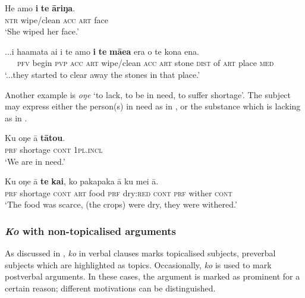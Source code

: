 \ea\label{ex:8.141}
\gll He amo \textbf{i} \textbf{te} \textbf{{\ꞌ}āriŋa}. \\
\textsc{ntr} wipe/clean \textsc{acc} \textsc{art} face \\

\glt 
‘She wiped her face.’ \textstyleExampleref{[Ley-9-55.030]}
\z

\ea\label{ex:8.142}
\gll ...i ha{\ꞌ}amata ai i te amo \textbf{i} \textbf{te} \textbf{mā{\ꞌ}ea} era o te kona ena. \\
~~~\textsc{pfv} begin \textsc{pvp} \textsc{acc} \textsc{art} wipe/clean \textsc{acc} \textsc{art} stone \textsc{dist} of \textsc{art} place \textsc{med} \\

\glt 
‘...they started to clear away the stones in that place.’ \textstyleExampleref{[R539-2.213]}
\z

Another example is \textit{oŋe} ‘to lack, to be in need, to suffer shortage’. The subject may express either the person(s) in need as in , or the substance which is lacking as in .

\ea\label{ex:8.143}
\gll Ku oŋe {\ꞌ}ā \textbf{tātou}. \\
\textsc{prf} shortage \textsc{cont} \textsc{1pl.incl} \\

\glt 
‘We are in need.’ \textstyleExampleref{[R352.118]}
\z

\ea\label{ex:8.144}
\gll Ku oŋe {\ꞌ}ā \textbf{te} \textbf{kai}, ko pakapaka {\ꞌ}ā ku mei {\ꞌ}ā. \\
\textsc{prf} shortage \textsc{cont} \textsc{art} food \textsc{prf} dry:\textsc{red} \textsc{cont} \textsc{prf} wither \textsc{cont} \\

\glt 
‘The food was scarce, (the crops) were dry, they were withered.’ \textstyleExampleref{[R352.112]} 
\z

\subsubsection{\textit{Ko} with non-topicalised arguments}\label{sec:8.6.4.5}
As discussed in , \textit{ko} in verbal clauses marks topicalised subjects, preverbal subjects which are highlighted as topics. Occasionally, \textit{ko} is used to mark postverbal arguments. In these cases, the argument is marked as prominent for a certain reason; different motivations can be distinguished.

